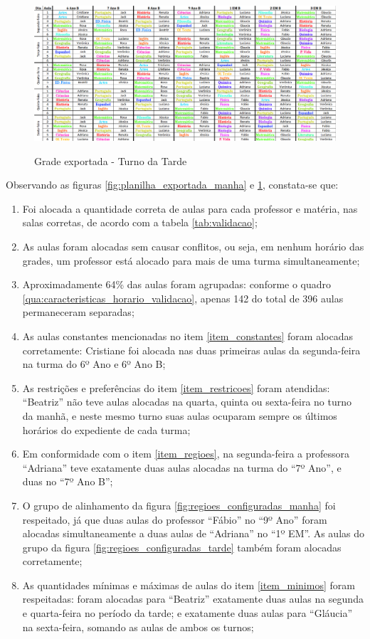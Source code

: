 \begin{figure}[p]
	\centering
	\caption{Grade exportada - Turno da Tarde}
	\includegraphics[width=1\textwidth]{./dados/figuras/planilha_exportada_tarde}
	\label{fig:planilha_exportada_tarde}
\end{figure}

\newpage
Observando as figuras \ref{fig:planilha_exportada_manha} e \ref{fig:planilha_exportada_tarde}, constata-se que:

\begin{enumerate}
	\item Foi alocada a quantidade correta de aulas para cada professor e matéria, nas salas corretas, de acordo com a tabela \ref{tab:validacao};
	\item As aulas foram alocadas sem causar conflitos, ou seja, em nenhum horário das grades, um professor está alocado para mais de uma turma simultaneamente;
	\item Aproximadamente 64\% das aulas foram agrupadas: conforme o quadro \ref{qua:caracteristicas_horario_validacao}, apenas 142 do total de 396 aulas permaneceram separadas;
	\item As aulas constantes mencionadas no item \ref{item_constantes} foram alocadas corretamente: Cristiane foi alocada nas duas primeiras aulas da segunda-feira na turma do 6º Ano e 6º Ano B;
	\item As restrições e preferências do item \ref{item_restricoes} foram atendidas: ``Beatriz'' não teve aulas alocadas na quarta, quinta ou sexta-feira no turno da manhã, e neste mesmo turno suas aulas ocuparam sempre os últimos horários do expediente de cada turma;
	\item Em conformidade com o item \ref{item_regioes}, na segunda-feira a professora ``Adriana'' teve exatamente duas aulas alocadas na turma do ``7º Ano'', e duas no ``7º Ano B'';
	\item O grupo de alinhamento da figura \ref{fig:regioes_configuradas_manha} foi respeitado, já que duas aulas do professor ``Fábio'' no ``9º Ano'' foram alocadas simultaneamente a duas aulas de ``Adriana'' no ``1º EM''. As aulas do grupo da figura \ref{fig:regioes_configuradas_tarde} também foram alocadas corretamente;
	\item As quantidades mínimas e máximas de aulas do item \ref{item_minimos} foram respeitadas: foram alocadas para ``Beatriz'' exatamente duas aulas na segunda e quarta-feira no período da tarde; e exatamente duas aulas para ``Gláucia'' na sexta-feira, somando as aulas de ambos os turnos;
\end{enumerate}      



